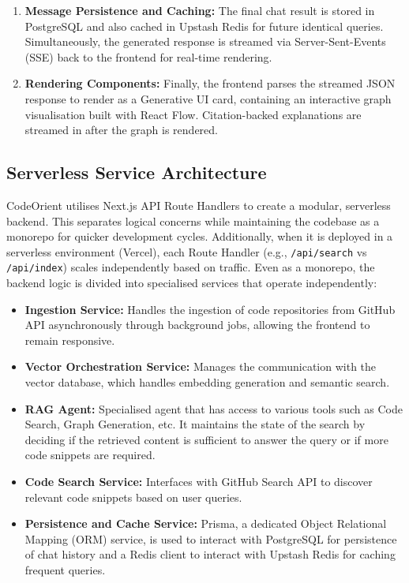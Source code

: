\begin{enumerate}
    \item \textbf{Message Persistence and Caching:} The final chat result is stored in PostgreSQL and also cached in Upstash Redis for future identical queries. Simultaneously, the generated response is streamed via Server-Sent-Events (SSE) back to the frontend for real-time rendering.
    \item \textbf{Rendering Components:} Finally, the frontend parses the streamed JSON response to render as a Generative UI card, containing an interactive graph visualisation built with React Flow. Citation-backed explanations are streamed in after the graph is rendered.
\end{enumerate}
\subsection{Serverless Service Architecture}
CodeOrient utilises Next.js API Route Handlers to create a modular, serverless backend. This separates logical concerns while maintaining the codebase as a monorepo for quicker development cycles. Additionally, when it is deployed in a serverless environment (Vercel), each Route Handler (e.g., \texttt{/api/search} vs \texttt{/api/index}) scales independently based on traffic.
Even as a monorepo, the backend logic is divided into specialised services that operate independently:
\begin{itemize}
    \item \textbf{Ingestion Service:} Handles the ingestion of code repositories from GitHub API asynchronously through background jobs, allowing the frontend to remain responsive.
    \item \textbf{Vector Orchestration Service:} Manages the communication with the vector database, which handles embedding generation and semantic search.
    \item \textbf{RAG Agent:} Specialised agent that has access to various tools such as Code Search, Graph Generation, etc. It maintains the state of the search by deciding if the retrieved content is sufficient to answer the query or if more code snippets are required.
    \item \textbf{Code Search Service:} Interfaces with GitHub Search API to discover relevant code snippets based on user queries.
    \item \textbf{Persistence and Cache Service:} Prisma, a dedicated Object Relational Mapping (ORM) service, is used to interact with PostgreSQL for persistence of chat history and a Redis client to interact with Upstash Redis for caching frequent queries.
\end{itemize}


